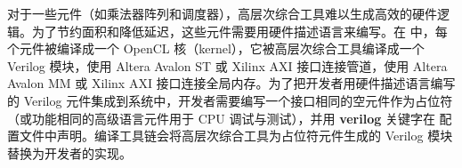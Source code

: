 对于一些元件（如乘法器阵列和调度器），高层次综合工具难以生成高效的硬件逻辑。为了节约面积和降低延迟，这些元件需要用硬件描述语言来编写。在 \name 中，每个元件被编译成一个 OpenCL 核（kernel），它被高层次综合工具编译成一个 Verilog 模块，使用 Altera Avalon ST 或 Xilinx AXI 接口连接管道，使用 Altera Avalon MM 或 Xilinx AXI 接口连接全局内存。为了把开发者用硬件描述语言编写的 Verilog 元件集成到系统中，开发者需要编写一个接口相同的空元件作为占位符（或功能相同的高级语言元件用于 CPU 调试与测试），并用 \textbf{verilog} 关键字在 \name 配置文件中声明。编译工具链会将高层次综合工具为占位符元件生成的 Verilog 模块替换为开发者的实现。

